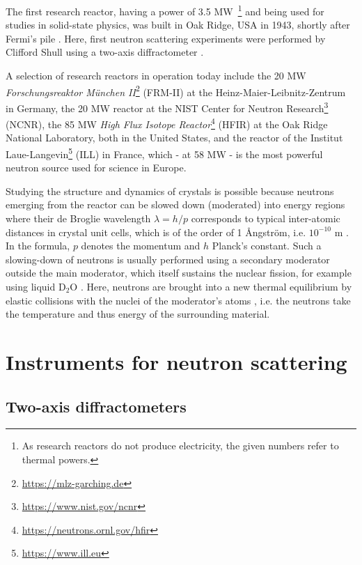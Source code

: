 The first research reactor, having a power of 3.5 MW~\footnote{As research reactors do not produce electricity, the given numbers refer to thermal powers.} and being used for studies in solid-state physics, was built in Oak Ridge, USA in 1943, shortly after Fermi's pile \cite[p. 3]{Jacrot2021}. 
Here, first neutron scattering experiments were performed by Clifford Shull using a two-axis diffractometer \cite[pp. 3, 37]{Jacrot2021}.

A selection of research reactors in operation today include the 20 MW \textit{Forschungsreaktor M\"unchen II}\footnote{\url{https://mlz-garching.de}} (FRM-II) at the Heinz-Maier-Leibnitz-Zentrum in Germany, the 20 MW reactor at the NIST Center for Neutron Research\footnote{\url{https://www.nist.gov/ncnr}} (NCNR), the 85 MW \textit{High Flux Isotope Reactor}\footnote{\url{https://neutrons.ornl.gov/hfir}} (HFIR) at the Oak Ridge National Laboratory, both in the United States, and the reactor of the Institut Laue-Langevin\footnote{\url{https://www.ill.eu}} (ILL) in France, which - at 58 MW - is the most powerful neutron source used for science in Europe.

Studying the structure and dynamics of crystals is possible because neutrons emerging from the reactor can be slowed down (moderated) into energy regions where their de Broglie wavelength $\lambda = h/p$ corresponds to typical inter-atomic distances in crystal unit cells, which is of the order of 1 \AA{}ngstr\"om, i.e. $10^{-10}$ m \cite[pp.1,3]{Squires2012}. In the formula, $p$ denotes the momentum and $h$ Planck's constant. Such a slowing-down of neutrons is usually performed using a secondary moderator outside the main moderator, which itself sustains the nuclear fission, for example using liquid $\mathrm{D_2O}$ \cite[p. 82]{Jacrot2021}. Here, neutrons are brought into a new thermal equilibrium by elastic collisions with the nuclei of the moderator's atoms \cite[p. 30]{Stacey2007}, i.e. the neutrons take the temperature and thus energy of the surrounding material.



\section{Instruments for neutron scattering \label{sec:instruments}}
\subsection{Two-axis diffractometers}

